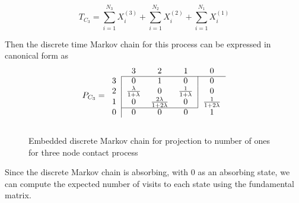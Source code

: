 \documentclass{article}
\theoremstyle{plain}
\theoremstyle{definition}
\theoremstyle{remark}
\numberwithin{equation}{section}
\begin{document}
\begin{equation}
    T_{C_3} = \sum_{i = 1}^{N_3} X_i^{(3)} + \sum_{i = 1}^{N_2} X_i^{(2)} + \sum_{i = 1}^{N_1} X_i^{(1)}
\end{equation}

Then the discrete time Markov chain for this process can be expressed in canonical form as
$$
P_{C_3} = \begin{blockarray}{ccccc}
    & 3 & 2 & 1 & 0\\
    \begin{block}{c|ccc|c}
    \cline{2-5}
        3 & 0 & 1 & 0 & 0 \\
        2 & \frac{\lambda}{1 + \lambda} & 0 &
        \frac{1}{1 + \lambda} & 0\\
        1 & 0 & \frac{2\lambda}{1 + 2 \lambda} & 0 & \frac{1}{1 + 2\lambda}\\
    \cline{2-4}
    \end{block}
    \begin{block}{c|cccc}
    0 & 0 & 0 & 0 & 1\\
    \end{block}
\end{blockarray}
$$

\begin{figure}[H]
    \centering
    \caption{Embedded discrete Markov chain for projection to number of ones for three node contact process}
    \label{fig:discrete_mc_three_contact}
\end{figure}

Since the discrete Markov chain is absorbing, with 0 as an absorbing state, we can compute the expected number of visits to each state using the fundamental matrix.

\end{document}
